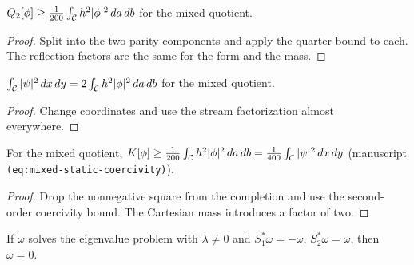 \begin{lemma}
\label{lem:mixed-second-order-coercivity}
\leanok
$Q_2[\phi]\ge\frac1{200}\int_{\mathcal{C}} h^2|\phi|^2\,da\,db$ for the mixed quotient.
\end{lemma}

\begin{proof}
\leanok
Split into the two parity components and apply the quarter bound to each.
The reflection factors are the same for the form and the mass.
\end{proof}

\begin{lemma}
\label{lem:mixed-stream-mass}
\leanok
$\int_{\mathcal{C}}|\psi|^2\,dx\,dy=2\int_{\mathcal{C}} h^2|\phi|^2\,da\,db$ for the mixed quotient.
\end{lemma}

\begin{proof}
\leanok
Change coordinates and use the stream factorization almost everywhere.
\end{proof}

\begin{theorem}
\label{thm:mixed-coercivity}
\leanok
For the mixed quotient,
$K[\phi]\ge\frac1{200}\int_{\mathcal{C}} h^2|\phi|^2\,da\,db=\frac1{400}\int_{\mathcal{C}}|\psi|^2\,dx\,dy$
(manuscript \texttt{(eq:mixed-static-coercivity)}).
\end{theorem}

\begin{proof}
\leanok
Drop the nonnegative square from the completion and use the second-order
coercivity bound. The Cartesian mass introduces a factor of two.
\end{proof}

\begin{theorem}
\label{thm:mixed-exclusion}
\leanok
If $\omega$ solves the eigenvalue problem with $\lambda\ne0$ and
$S_1^*\omega=-\omega$, $S_2^*\omega=\omega$, then $\omega=0$.
\end{theorem}

